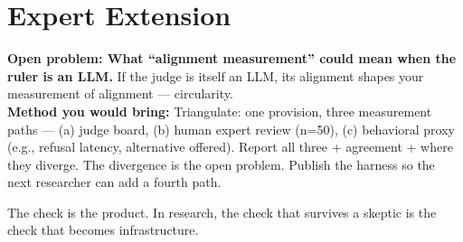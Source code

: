 \section{Expert Extension}
\rbadge
\textbf{Open problem: What ``alignment measurement'' could mean when the ruler is an LLM.} If the judge is itself an LLM, its alignment shapes your measurement of alignment — circularity.\\
\textbf{Method you would bring:} Triangulate: one provision, three measurement paths — (a) judge board, (b) human expert review (n=50), (c) behavioral proxy (e.g., refusal latency, alternative offered). Report all three + agreement + where they diverge. The divergence is the open problem. Publish the harness so the next researcher can add a fourth path.

\begin{checkbox}
The check is the product. In research, the check that survives a skeptic is the check that becomes infrastructure.
\end{checkbox}
